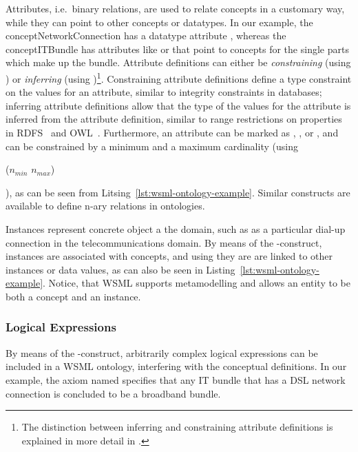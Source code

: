 Attributes, i.e.\ binary relations, are used to relate concepts in
a customary way, while they can point to other concepts or
datatypes. In our example, the concept{NetworkConnection} has a
datatype attribute , whereas the
concept{ITBundle} has attributes like  or
 that point to concepts for the single
parts which make up the bundle. Attribute definitions can either
be \emph{constraining} (using ) or \emph{inferring}
(using )\footnote{The distinction
  between inferring and constraining attribute definitions is
  explained in more detail in \cite[Section
  2]{debr-etal-2005c}.}. Constraining attribute definitions
define a type constraint on the values for an attribute, similar
to integrity constraints in databases; inferring attribute
definitions allow that the type of the values for the attribute is
inferred from the attribute definition, similar to range
restrictions on properties in
RDFS~\cite{Brickley+Guha-VocaDescLang:03} and
OWL~\cite{Dean+Schreiber-OntoLangRefe:04}. Furthermore, an
attribute can be marked as , , or
, and can be constrained by a minimum and a
maximum cardinality (using \begin{footnotesize}\textsf{($n_{min}$
$n_{max}$)}\end{footnotesize}), as can be seen from
Litsing~\ref{lst:wsml-ontology-example}. Similar constructs are
available to define n-ary relations in ontologies.

Instances represent concrete object a the domain, such as
 as a particular dial-up connection in the
telecommunications domain. By means of the
-construct, instances are associated with concepts,
and using  they are are linked to other instances
or data values, as can also be seen in
Listing~\ref{lst:wsml-ontology-example}. Notice, that WSML
supports metamodelling and allows an entity to be both a concept
and an instance.

\subsubsection{Logical Expressions}
By means of the -construct, arbitrarily complex
logical expressions can be included in a WSML ontology,
interfering with the conceptual definitions. In our example, the
axiom named 
specifies that any IT bundle that has a DSL network connection is
concluded to be a broadband bundle.


